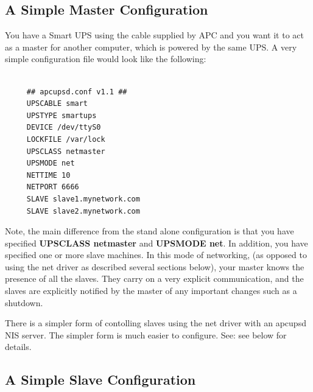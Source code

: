 \label{A-Simple-Master-Configuration}

\subsection*{A Simple Master Configuration}

\label{index-Configuration_002c-Master-74}
\label{index-Master_002c-config-example-75}
\label{index-Example_002c-Master-conf-76}
You have a Smart UPS using the cable supplied by APC and you want it to act as
a master for another computer, which is powered by the same UPS. A very simple
configuration file would look like the following: 

\footnotesize
\begin{verbatim}
     
     ## apcupsd.conf v1.1 ##
     UPSCABLE smart
     UPSTYPE smartups
     DEVICE /dev/ttyS0
     LOCKFILE /var/lock
     UPSCLASS netmaster
     UPSMODE net
     NETTIME 10
     NETPORT 6666
     SLAVE slave1.mynetwork.com
     SLAVE slave2.mynetwork.com
\end{verbatim}
\normalsize

Note, the main difference from the stand alone configuration is that you have
specified {\bf UPSCLASS netmaster} and {\bf UPSMODE net}.  In addition, you
have specified one or more slave machines.  In this mode of networking, (as
opposed to using the net driver as described several sections below), your
master knows the presence of all the slaves.  They carry on a very explicit
communication, and the slaves are explicitly notified by the master of any
important changes such as a shutdown.  

There is a simpler form of contolling slaves using the net driver with an
apcupsd NIS server. The simpler form is much easier to configure. See: see 
below for details. 

\label{A-Simple-Slave-Configuration}

\subsection*{A Simple Slave Configuration}

